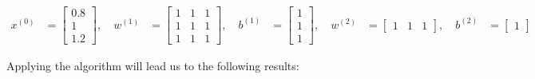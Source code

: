 \documentclass[12pt]{article}
\begin{document}
\begin{enumerate}[leftmargin=\labelsep]
        \begin{equation*}
          \begin{aligned}
            x^{(0)} & = \begin{bmatrix}
                          0.8 \\
                          1   \\
                          1.2
                        \end{bmatrix}, \quad
            w^{(1)} & = \begin{bmatrix}
                          1 & 1 & 1 \\
                          1 & 1 & 1 \\
                          1 & 1 & 1
                        \end{bmatrix}, \quad
            b^{(1)} & = \begin{bmatrix}
                          1 \\
                          1 \\
                          1
                        \end{bmatrix}, \quad
            w^{(2)} & = \begin{bmatrix}
                          1 & 1 & 1
                        \end{bmatrix}, \quad
            b^{(2)} & = \begin{bmatrix}
                          1
                        \end{bmatrix}
          \end{aligned}
        \end{equation*}

        Applying the algorithm will lead us to the following results:


\end{enumerate}
\end{document}
